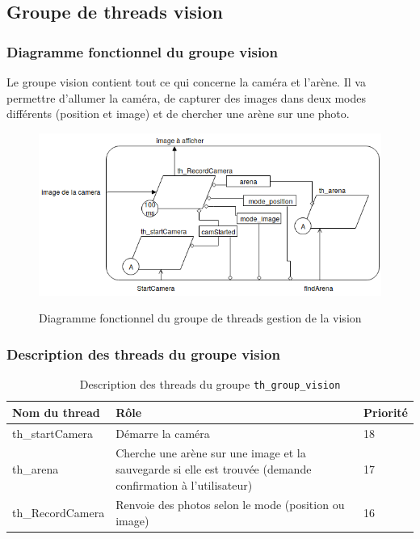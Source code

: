 \documentclass[11pt, a4paper]{paper}
\begin{document}
\subsection{Groupe de threads vision}

\subsubsection{Diagramme fonctionnel du groupe vision}

{Le groupe vision contient tout ce qui concerne la caméra et l'arène. Il va permettre d'allumer la caméra, de capturer des images dans deux modes différents (position et image) et de chercher une arène sur une photo.}

\begin{figure}[htp]
\label{fig:act_communiquer}
\begin{center}
{\includegraphics[scale=.4]{./dossier_conception/diag_fonc_vision.png}}
{\caption{Diagramme fonctionnel du groupe de threads gestion de la vision}}
\end{center}
\end{figure}

\subsubsection{Description des threads du groupe vision}

\begin{table}[htp]
\caption{Description des threads du groupe {\tt th\_group\_vision}}
\begin{center}
\begin{tabular}{|p{3cm}|p{8.5cm}|p{2cm}|}
\hline
\bf Nom du thread &	\bf Rôle &	\bf Priorité \\
\hline
\hline
\color{blue}th\_startCamera &	\color{blue}Démarre la caméra &	\color{blue}18\\
\hline
\color{blue}th\_arena &	\color{blue}Cherche une arène sur une image et la sauvegarde si elle est trouvée (demande confirmation à l'utilisateur) &	\color{blue}17\\
\hline
\color{blue}th\_RecordCamera &	\color{blue}Renvoie des photos selon le mode (position ou image) &	\color{blue}16\\
\hline
\end{tabular}
\end{center}
\label{tab:gt_moniteur}
\end{table}%
\FloatBarrier
\end{document}
